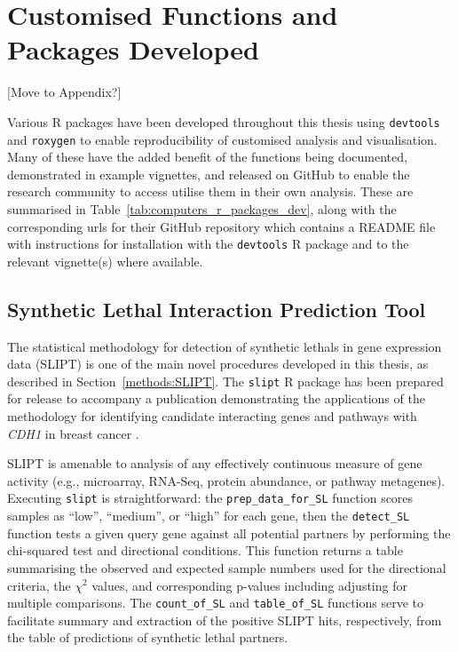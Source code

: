 \fi	

\FloatBarrier

\section{Customised Functions and Packages Developed} \label{methods:r_packages}

[Move to Appendix?]

Various R packages have been developed throughout this thesis using \texttt{devtools} \citep{devtools} and \texttt{roxygen} \citep{roxygen} to enable reproducibility of customised analysis and visualisation. Many of these have the added benefit of the functions being documented, demonstrated in example vignettes, and released on GitHub to enable the research community to access utilise them in their own analysis. These are summarised in Table~\ref{tab:computers_r_packages_dev}, along with the corresponding urls for their GitHub repository which contains a README file with instructions for installation with the \texttt{devtools} R package \citep{devtools} and  to the relevant vignette(s) where available.

\subsection{Synthetic Lethal Interaction Prediction Tool}
The statistical methodology for detection of \glspl{synthetic lethal} in \gls{gene expression} data (\gls{SLIPT}) is one of the main novel procedures developed in this thesis, as described in Section~\ref{methods:SLIPT}. The \texttt{slipt} R package has been prepared for release to accompany a publication demonstrating the applications of the methodology for identifying candidate interacting genes and pathways with \textit{CDH1} in breast cancer \citep{TCGA2012}.

\gls{SLIPT} is amenable to analysis of any effectively continuous measure of gene activity (e.g., \gls{microarray}, \acrshort{RNA}-Seq, protein abundance, or pathway \glspl{metagene}). Executing \texttt{slipt} is straightforward: the \texttt{prep\_data\_for\_SL} function scores samples as ``low'', ``medium'', or ``high'' for each gene, then the \texttt{detect\_SL} function tests a given query gene against all potential partners by performing the chi-squared test and directional conditions. This function returns a table summarising the observed and expected sample numbers used for the directional criteria, the $\chi^2$ values, and corresponding p-values including adjusting for multiple comparisons. The \texttt{count\_of\_SL} and \texttt{table\_of\_SL} functions serve to facilitate summary and extraction of the positive \gls{SLIPT} hits, respectively, from the table of predictions of \gls{synthetic lethal} partners.

